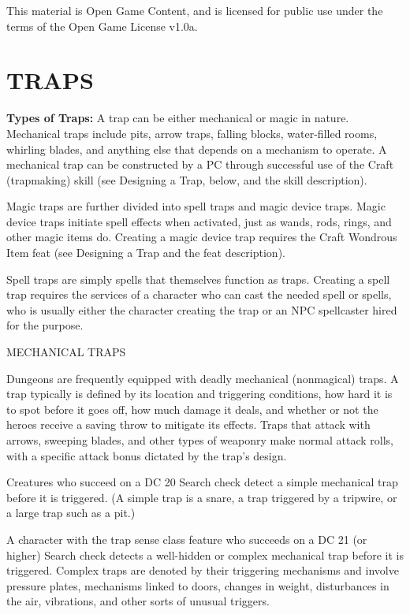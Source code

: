 \documentclass{article}
\begin{document}
This material is Open Game Content, and is licensed for public use under the terms 
of the Open Game License v1.0a.

\section*{{\LARGE{}TRAPS}}

\vspace{12pt}
\textbf{Types of Traps:} A trap can be either mechanical or magic in nature. Mechanical 
traps include pits, arrow traps, falling blocks, water-filled rooms, whirling blades, 
and anything else that depends on a mechanism to operate. A mechanical trap can 
be constructed by a PC through successful use of the Craft (trapmaking) skill (see 
Designing a Trap, below, and the skill description).

Magic traps are further divided into spell traps and magic device traps. Magic 
device traps initiate spell effects when activated, just as wands, rods, rings, 
and other magic items do. Creating a magic device trap requires the Craft Wondrous 
Item feat (see Designing a Trap and the feat description).

Spell traps are simply spells that themselves function as traps\textit{. }Creating 
a spell trap requires the services of a character who can cast the needed spell 
or spells, who is usually either the character creating the trap or an NPC spellcaster 
hired for the purpose.

\vspace{12pt}
MECHANICAL TRAPS

Dungeons are frequently equipped with deadly mechanical (nonmagical) traps. A trap 
typically is defined by its location and triggering conditions, how hard it is 
to spot before it goes off, how much damage it deals, and whether or not the heroes 
receive a saving throw to mitigate its effects. Traps that attack with arrows, 
sweeping blades, and other types of weaponry make normal attack rolls, with a specific 
attack bonus dictated by the trap's design.

Creatures who succeed on a DC 20 Search check detect a simple mechanical trap before 
it is triggered. (A simple trap is a snare, a trap triggered by a tripwire, or 
a large trap such as a pit.)

A character with the trap sense class feature who succeeds on a DC 21 (or higher) 
Search check detects a well-hidden or complex mechanical trap before it is triggered. 
Complex traps are denoted by their triggering mechanisms and involve pressure plates, 
mechanisms linked to doors, changes in weight, disturbances in the air, vibrations, 
and other sorts of unusual triggers.
\end{document}
